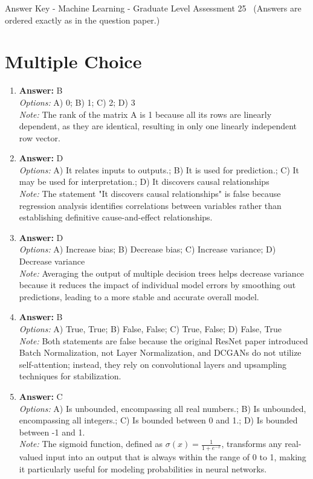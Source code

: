\documentclass[12pt]{article}
\begin{document}
\begin{center}
Answer Key - Machine Learning - Graduate Level Assessment 25 \
\small (Answers are ordered exactly as in the question paper.)
\end{center}

\section*{Multiple Choice}
\begin{enumerate}[label=\arabic*.]
\item \textbf{Answer:} B
\\ \textit{Options:} A) 0; B) 1; C) 2; D) 3
\\ \textit{Note:} The rank of the matrix A is 1 because all its rows are linearly dependent, as they are identical, resulting in only one linearly independent row vector.
\item \textbf{Answer:} D
\\ \textit{Options:} A) It relates inputs to outputs.; B) It is used for prediction.; C) It may be used for interpretation.; D) It discovers causal relationships
\\ \textit{Note:} The statement "It discovers causal relationships" is false because regression analysis identifies correlations between variables rather than establishing definitive cause-and-effect relationships.
\item \textbf{Answer:} D
\\ \textit{Options:} A) Increase bias; B) Decrease bias; C) Increase variance; D) Decrease variance
\\ \textit{Note:} Averaging the output of multiple decision trees helps decrease variance because it reduces the impact of individual model errors by smoothing out predictions, leading to a more stable and accurate overall model.
\item \textbf{Answer:} B
\\ \textit{Options:} A) True, True; B) False, False; C) True, False; D) False, True
\\ \textit{Note:} Both statements are false because the original ResNet paper introduced Batch Normalization, not Layer Normalization, and DCGANs do not utilize self-attention; instead, they rely on convolutional layers and upsampling techniques for stabilization.
\item \textbf{Answer:} C
\\ \textit{Options:} A) Is unbounded, encompassing all real numbers.; B) Is unbounded, encompassing all integers.; C) Is bounded between 0 and 1.; D) Is bounded between -1 and 1.
\\ \textit{Note:} The sigmoid function, defined as \( \sigma(x) = \frac{1}{1 + e^{-x}} \), transforms any real-valued input into an output that is always within the range of 0 to 1, making it particularly useful for modeling probabilities in neural networks.
\end{enumerate}
\end{document}

